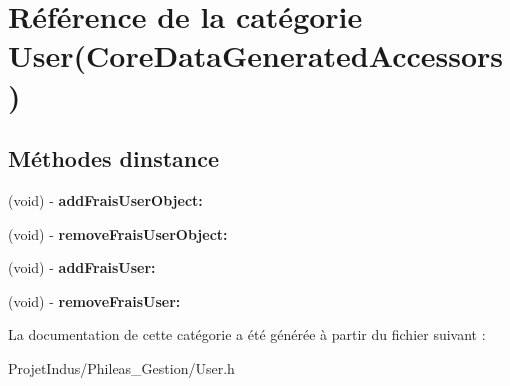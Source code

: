 \hypertarget{category_user_07_core_data_generated_accessors_08}{}\section{Référence de la catégorie User(Core\+Data\+Generated\+Accessors)}
\label{category_user_07_core_data_generated_accessors_08}
\subsection*{Méthodes d\textquotesingle{}instance}
\begin{DoxyCompactItemize}
\item 
\hypertarget{category_user_07_core_data_generated_accessors_08_a32af502ae11d0a7dbbff531c1ffc3504}{}(void) -\/ {\bfseries add\+Frais\+User\+Object\+:}\label{category_user_07_core_data_generated_accessors_08_a32af502ae11d0a7dbbff531c1ffc3504}

\item 
\hypertarget{category_user_07_core_data_generated_accessors_08_a3585a97b2ec38114120edc0dc590e875}{}(void) -\/ {\bfseries remove\+Frais\+User\+Object\+:}\label{category_user_07_core_data_generated_accessors_08_a3585a97b2ec38114120edc0dc590e875}

\item 
\hypertarget{category_user_07_core_data_generated_accessors_08_a8675c260b3b8777a4c0ec0afd604d42a}{}(void) -\/ {\bfseries add\+Frais\+User\+:}\label{category_user_07_core_data_generated_accessors_08_a8675c260b3b8777a4c0ec0afd604d42a}

\item 
\hypertarget{category_user_07_core_data_generated_accessors_08_a491aadb2524c74a16b71683fbff5a4d1}{}(void) -\/ {\bfseries remove\+Frais\+User\+:}\label{category_user_07_core_data_generated_accessors_08_a491aadb2524c74a16b71683fbff5a4d1}

\end{DoxyCompactItemize}


La documentation de cette catégorie a été générée à partir du fichier suivant \+:\begin{DoxyCompactItemize}
\item 
Projet\+Indus/\+Phileas\+\_\+\+Gestion/User.\+h\end{DoxyCompactItemize}
